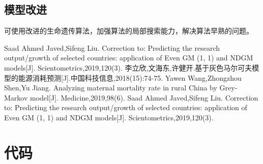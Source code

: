 \documentclass{whutmod}
\begin{document}
	\subsection{模型改进}
	可使用改进的生命遗传算法，加强算法的局部搜索能力，解决算法早熟的问题。

 
	\newpage	%
	\nocite{*}		%
%
%	
\begin{thebibliography}{9}%
	Saad Ahmed Javed,Sifeng Liu. Correction to: Predicting the research output/growth of selected countries: application of Even GM (1, 1) and NDGM models[J]. Scientometrics,2019,120(3).
	李立欣,文海东,许健开.基于灰色马尔可夫模型的能源消耗预测[J].中国科技信息,2018(15):74-75.	
	Yawen Wang,Zhongzhou Shen,Yu Jiang. Analyzing maternal mortality rate in rural China by Grey-Markov model[J]. Medicine,2019,98(6).
	Saad Ahmed Javed,Sifeng Liu. Correction to: Predicting the research output/growth of selected countries: application of Even GM (1, 1) and NDGM models[J]. Scientometrics,2019,120(3).

\end{thebibliography}

	\newpage
	\appendix %

\section{代码}
\end{document}
